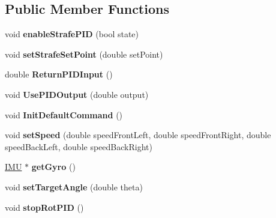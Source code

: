 \subsection*{Public Member Functions}
\begin{DoxyCompactItemize}
\item 
\hypertarget{class_drive_bae_acaf84db82e4cf983a7af983e39f81b45}{}void {\bfseries enable\+Strafe\+P\+I\+D} (bool state)\label{class_drive_bae_acaf84db82e4cf983a7af983e39f81b45}

\item 
\hypertarget{class_drive_bae_aadff4067d0f5558bd5678f8e52dffb32}{}void {\bfseries set\+Strafe\+Set\+Point} (double set\+Point)\label{class_drive_bae_aadff4067d0f5558bd5678f8e52dffb32}

\item 
\hypertarget{class_drive_bae_ac2497d0afa36b5c72f2ee86f8fd892cf}{}double {\bfseries Return\+P\+I\+D\+Input} ()\label{class_drive_bae_ac2497d0afa36b5c72f2ee86f8fd892cf}

\item 
\hypertarget{class_drive_bae_a423ddc49659be37aed2c0509cc55289b}{}void {\bfseries Use\+P\+I\+D\+Output} (double output)\label{class_drive_bae_a423ddc49659be37aed2c0509cc55289b}

\item 
\hypertarget{class_drive_bae_a2adbbdb59bb0fdc9ed466a3d2edd92ff}{}void {\bfseries Init\+Default\+Command} ()\label{class_drive_bae_a2adbbdb59bb0fdc9ed466a3d2edd92ff}

\item 
\hypertarget{class_drive_bae_a1d381de7dfb03bd3dd138a889c01e880}{}void {\bfseries set\+Speed} (double speed\+Front\+Left, double speed\+Front\+Right, double speed\+Back\+Left, double speed\+Back\+Right)\label{class_drive_bae_a1d381de7dfb03bd3dd138a889c01e880}

\item 
\hypertarget{class_drive_bae_ae0cfe1125d3065eb915111e29e49281c}{}\hyperlink{class_i_m_u}{I\+M\+U} $\ast$ {\bfseries get\+Gyro} ()\label{class_drive_bae_ae0cfe1125d3065eb915111e29e49281c}

\item 
\hypertarget{class_drive_bae_a489a12b403e0b818083402007ea2e314}{}void {\bfseries set\+Target\+Angle} (double theta)\label{class_drive_bae_a489a12b403e0b818083402007ea2e314}

\item 
\hypertarget{class_drive_bae_ab6042ad688723f278787c3747de2f263}{}void {\bfseries stop\+Rot\+P\+I\+D} ()\label{class_drive_bae_ab6042ad688723f278787c3747de2f263}


\end{DoxyCompactItemize}
